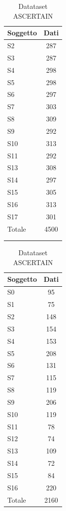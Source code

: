 \begin{table}[h]
\small
    \parbox{.45\linewidth}{
    	\begin{center}
    		\begin{tabular}{l|c}
    		     \textbf{Soggetto} & \textbf{Dati}\\
    		     \hline
    		     S2 & 287 \\
    		     S3 & 287 \\
    		     S4 & 298 \\
    		     S5 & 298 \\
    		     S6 & 297 \\
    		     S7 & 303 \\
    		     S8 & 309 \\
    		     S9 & 292 \\
    		     S10 & 313 \\
    		     S11 & 292 \\
    		     S13 & 308 \\
    		     S14 & 297 \\
    		     S15 & 305 \\
    		     S16 & 313 \\
    		     S17 & 301 \\
    		     \hline
    		     Totale & 4500\\
    		     \multicolumn{1}{c}{}\\
    		     \multicolumn{1}{c}{}
    		\end{tabular}
    		\caption{Datataset WESAD}
    		\label{tab:splittedwesad}
    	\end{center}
	}
    \parbox{.45\linewidth}{
    	\begin{center}
    		\begin{tabular}{l|c}
    		     \textbf{Soggetto} & \textbf{Dati}\\
    		     \hline
    		     S0 & 95 \\
    		     S1 & 75 \\
    		     S2 & 148 \\
    		     S3 & 154 \\
    		     S4 & 153 \\
    		     S5 & 208 \\
    		     S6 & 131 \\
    		     S7 & 115 \\
    		     S8 & 119 \\
    		     S9 & 206 \\
    		     S10 & 119 \\
    		     S11 & 78 \\
    		     S12 & 74 \\
    		     S13 & 109 \\
    		     S14 & 72 \\
    		     S15 & 84 \\
    		     S16 & 220 \\
    		     \hline
    		     Totale & 2160
    		\end{tabular}
    		\caption{Datataset ASCERTAIN}
    		\label{tab:splittedascertain}
    	\end{center}
    }
\end{table}
